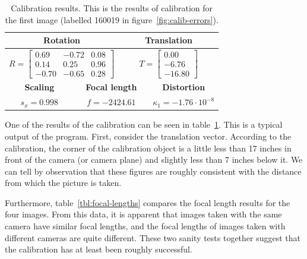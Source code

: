 \begin{table}[htb]
  \centering
  \begin{tabular}{c c c c c c}
    \toprule
    \multicolumn{3}{c}{\textbf{Rotation}} & \multicolumn{3}{c}{\textbf{Translation}}\\
    \midrule
    \multicolumn{3}{c}{$R=\begin{bmatrix}0.69 & -0.72 & 0.08\\
    0.14 & 0.25 & 0.96\\
    -0.70 & -0.65 & 0.28\end{bmatrix}$} &
    \multicolumn{3}{c}{$T=\begin{bmatrix}0.00\\-6.76\\-16.80\end{bmatrix}$} \\
    \midrule
    \multicolumn{2}{c}{\textbf{Scaling}} &
    \multicolumn{2}{c}{\textbf{Focal length}} &
    \multicolumn{2}{c}{\textbf{Distortion}}\\
    \midrule
    \multicolumn{2}{c}{$s_x =0.998$} &
    \multicolumn{2}{c}{$f=-2424.61$} &
    \multicolumn{2}{c}{$\kappa_1=-1.76 \cdot 10^{-8}$}\\
    \bottomrule
  \end{tabular}
  \caption[Calibration results]{Calibration results. This is the
    results of calibration for the first image (labelled 160019 in
    figure~\ref{fig:calib-errors}).}
  \label{tbl:calib-results}
\end{table}

One of the results of the calibration can be seen in
table~\ref{tbl:calib-results}. This is a typical output of the program. First, consider the translation vector. According to the calibration, the corner of the calibration object is
a little less than 17 inches in front of the camera (or camera plane) and slightly less than 7 inches below it. We can tell by observation that these figures are roughly consistent with the
distance from which the picture is taken.

Furthermore, table~\ref{tbl:focal-lengths} compares the focal length results for the four images. From this data, it is
apparent that images taken with the same camera have similar focal
lengths, and the focal lengths of images taken with different cameras
are quite different. These two sanity tests together suggest that the calibration has at least been roughly successful.

